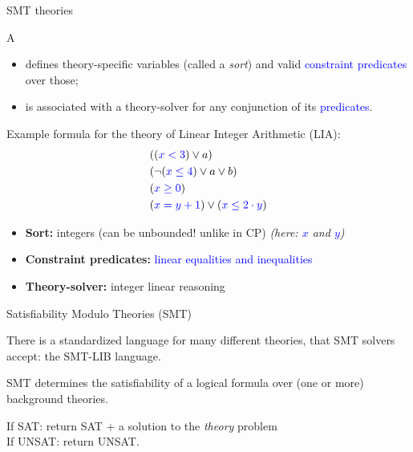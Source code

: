 \documentclass{cons-beamer}
\begin{document}
\begin{frame}{SMT theories}
	
	\begin{definition}
		A 
		\begin{itemize}
			\item defines theory-specific variables (called a \textit{sort}) and valid \textcolor{blue}{constraint predicates} over those;
			\item is associated with a theory-solver for any conjunction of its
			\textcolor{blue}{predicates}.
		\end{itemize}
	\end{definition}
	\pause
	
	Example formula for the theory of Linear Integer Arithmetic (LIA):
	{\small
	\begin{align*}
		& ((\textcolor{blue}{x < 3}) \lor a) \\
		& (\neg(\textcolor{blue}{x \le 4}) \lor a \lor b) \\
		& (\textcolor{blue}{x \geq 0})\\
		& (\textcolor{blue}{x = y + 1}) \lor (\textcolor{blue}{x \leq 2 \cdot y})
	\end{align*}
	}

	\begin{itemize}
		\item \textbf{Sort:} integers (can be unbounded! unlike in CP) \textit{(here: \textcolor{blue}{$x$} and \textcolor{blue}{$y$})}
		\item \textbf{Constraint predicates:} \textcolor{blue}{linear equalities and inequalities}
		\item \textbf{Theory-solver:} integer linear reasoning
	\end{itemize}
\end{frame}

\begin{frame}{Satisfiability Modulo Theories (SMT)}
	
	There is a standardized language for many different theories, that SMT solvers accept: the SMT-LIB language.
	\vfill
	
	SMT determines the satisfiability of a logical formula over (one or more) background theories.
	\vfill
	
    If SAT: return SAT + a solution to the \emph{theory} problem\\
    If UNSAT: return UNSAT.
    \vfill
    
\end{frame}
\end{document}
